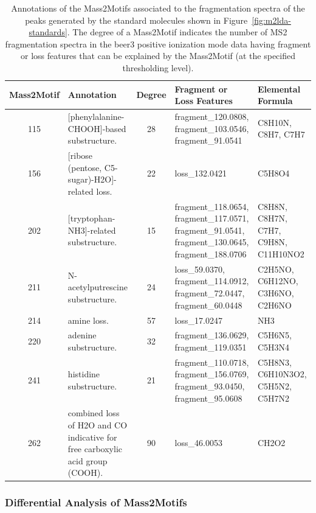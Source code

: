 \begin{table}
\small
\begin{centering}
\begin{tabular}{| c | p{4cm} | c | p{3.5cm} | p{2.5cm} |}
\hline 
Mass2Motif & Annotation & Degree & Fragment or Loss Features & Elemental Formula\tabularnewline
\hline 
\hline 
115 & {[}phenylalanine-CHOOH{]}-based substructure.  & 28 & fragment\_120.0808, fragment\_103.0546, fragment\_91.0541 & C8H10N, \newline C8H7, \newline C7H7\tabularnewline
\hline 
156 & {[}ribose (pentose, C5-sugar)-H2O{]}-related loss.  & 22 & loss\_132.0421 & C5H8O4 \tabularnewline
\hline 
202 & {[}tryptophan-NH3{]}-related substructure.  & 15 & fragment\_118.0654, 
fragment\_117.0571, 
fragment\_91.0541, 
fragment\_130.0645,
fragment\_188.0706 & C8H8N, \newline
C8H7N, \newline
C7H7, \newline
C9H8N, \newline
C11H10NO2\tabularnewline
\hline 
211 & N-acetylputrescine substructure.  & 24 & loss\_59.0370, \newline
fragment\_114.0912, 
fragment\_72.0447, 
fragment\_60.0448 & C2H5NO, 
C6H12NO, C3H6NO, 
C2H6NO\tabularnewline
\hline 
214 & amine loss.  & 57 & loss\_17.0247  & NH3\tabularnewline
\hline 
220 & adenine substructure.  & 32 & fragment\_136.0629, 
fragment\_119.0351 & C5H6N5, 
C5H3N4\tabularnewline
\hline 
241 & histidine substructure.  & 21 & fragment\_110.0718, 
fragment\_156.0769, 
fragment\_93.0450, 
fragment\_95.0608 & C5H8N3, 
C6H10N3O2, 
C5H5N2, 
C5H7N2\tabularnewline
\hline 
262 & combined loss of H2O and CO \textendash{} indicative for free carboxylic
acid group (COOH).  & 90 & loss\_46.0053  & CH2O2 \tabularnewline
\hline 
\end{tabular}
\par\end{centering}
\caption{Annotations of the Mass2Motifs associated to the fragmentation spectra
of the peaks generated by the standard molecules shown in Figure~\ref{fig:m2lda-standards}. The degree of
a Mass2Motif indicates the number of MS2 fragmentation spectra in
the beer3 positive ionization mode data having fragment or loss features
that can be explained by the Mass2Motif (at the specified thresholding
level). \label{tab:ms2lda-standards}}
\end{table}
 
\subsubsection{Differential Analysis of Mass2Motifs}


